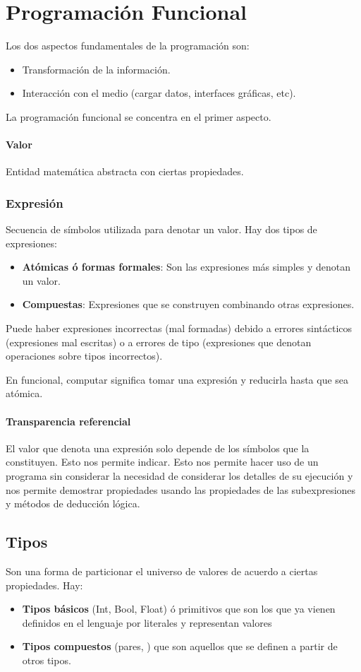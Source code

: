 \section{Programación Funcional}
Los dos aspectos fundamentales de la programación son:
\begin{itemize}
	\item Transformación de la información.
	\item Interacción con el medio (cargar datos, interfaces gráficas, etc).
\end{itemize}
La programación funcional se concentra en el primer aspecto.

\paragraph{Valor} Entidad matemática abstracta con ciertas propiedades.

\subsubsection{Expresión} 

Secuencia de símbolos utilizada para denotar un valor. Hay dos tipos de expresiones:
\begin{itemize}
	\item \textbf{Atómicas ó formas formales}: Son las expresiones más simples y denotan un valor.
	\item \textbf{Compuestas}: Expresiones que se construyen combinando otras expresiones.
\end{itemize}

Puede haber expresiones incorrectas (mal formadas) debido a errores sintácticos (expresiones mal escritas) o a errores de tipo (expresiones que denotan operaciones sobre tipos incorrectos).

En funcional, computar significa tomar una expresión y reducirla hasta que sea atómica.

\paragraph{Transparencia referencial} El valor que denota una expresión solo depende de los símbolos que la constituyen. Esto nos permite indicar. Esto nos permite hacer uso de un programa sin considerar la necesidad de considerar los detalles de su ejecución y nos permite demostrar propiedades usando las propiedades de las subexpresiones y métodos  de deducción lógica.

\subsection{Tipos}
Son una forma de particionar el universo de valores de acuerdo a ciertas propiedades. Hay:
\begin{itemize}
	\item \textbf{Tipos básicos} (Int, Bool, Float) ó primitivos que son los que ya vienen definidos en el lenguaje por literales y representan valores 
	\item \textbf{Tipos compuestos} (pares, ) que son aquellos que se definen a partir de otros tipos.
\end{itemize}

